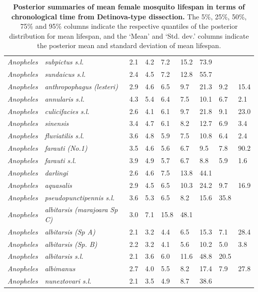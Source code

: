 \documentclass[12pt]{article}
\begin{document}
\begin{table}[htbp!]
\begin{tabular}{l|l|l|l|l|l|l|l|l}
	\\
	\textit{Anopheles} & \textit{subpictus s.l.} & 2.1 & 4.2 & 7.2 & 15.2 & 73.9 & \text{$>$100}
	& \text{$>$100} \\
	\textit{Anopheles} & \textit{sundaicus s.l.} & 2.4 & 4.5 & 7.2 & 12.8 & 55.7 & \text{$>$100}
	& \text{$>$100} \\
	\textit{Anopheles} & \textit{anthropophagus (lesteri)} & 2.9 & 4.6 & 6.5 & 9.7 & 21.3 & 9.2
	& 15.4 \\
	\textit{Anopheles} & \textit{annularis s.l.} & 4.3 & 5.4 & 6.4 & 7.5 & 10.1 & 6.7 & 2.1 \\
	\textit{Anopheles} & \textit{culicifacies s.l.} & 2.6 & 4.1 & 6.1 & 9.7 & 21.8 & 9.1 & 23.0
	\\
	\textit{Anopheles} & \textit{sinensis} & 3.4 & 4.7 & 6.1 & 8.2 & 12.7 & 6.9 & 3.4 \\
	\textit{Anopheles} & \textit{fluviatilis s.l.} & 3.6 & 4.8 & 5.9 & 7.5 & 10.8 & 6.4 & 2.4 \\
	\textit{Anopheles} & \textit{farauti (No.1)} & 3.5 & 4.6 & 5.6 & 6.7 & 9.5 & 7.8 &
	90.2 \\
	\textit{Anopheles} & \textit{farauti s.l.} & 3.9 & 4.9 & 5.7 & 6.7 & 8.8 & 5.9 & 1.6 \\
	\textit{Anopheles} & \textit{darlingi} & 2.6 & 4.6 & 7.5 & 13.8 & 44.1 & \text{$>$100} &
	\text{$>$100} \\
	\textit{Anopheles} & \textit{aquasalis} & 2.9 & 4.5 & 6.5 & 10.3 & 24.2 & 9.7 & 16.9 \\
	\textit{Anopheles} & \textit{pseudopunctipennis s.l.} & 3.6 & 5.3 & 6.5 & 8.2 & 15.6 & 35.8
	& \text{$>$100} \\
	\textit{Anopheles} & \textit{albitarsis (marajoara Sp C)} & 3.0 & 7.1 & 15.8 & 48.1
	& \text{$>$100} & \text{$>$100} & \text{$>$100} \\
	\textit{Anopheles} & \textit{albitarsis (Sp A)} & 2.1 & 3.2 & 4.4 & 6.5 & 15.3 &
	7.1 & 28.4 \\
	\textit{Anopheles} & \textit{albitarsis (Sp. B)} & 2.2 & 3.2 & 4.1 & 5.6 & 10.2 & 5.0 & 3.8
	\\
	\textit{Anopheles} & \textit{albitarsis s.l.} & 2.1 & 3.6 & 6.0 & 11.6 & 48.8 & 20.5 &
	\text{$>$100} \\
	\textit{Anopheles} & \textit{albimanus} & 2.7 & 4.0 & 5.5 & 8.2 & 17.4 & 7.9 & 27.8 \\
	\textit{Anopheles} & \textit{nuneztovari s.l.} & 2.1 & 3.5 & 4.9 & 8.7 & 38.6 &
	\text{$>$100} & \text{$>$100} \\
\end{tabular}
\caption{\textbf{Posterior summaries of mean female mosquito lifespan in terms of chronological time from Detinova-type dissection.} The 5\%, 25\%, 50\%, 75\% and 95\% columns indicate the respective quantiles of the posterior distribution for mean lifespan, and the `Mean' and `Std. dev.' columns indicate the posterior mean and standard deviation of mean lifespan.}
\label{tab:detinova_lifespan_chronological}%
\end{table}
\end{document}
